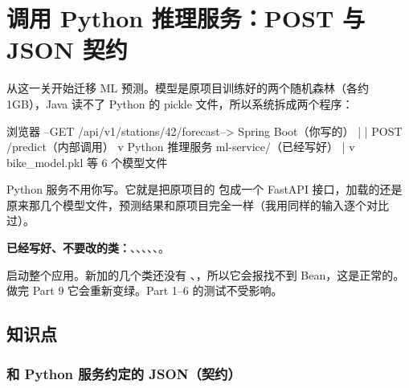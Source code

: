 \chapter{调用 Python 推理服务：POST 与 JSON 契约}

从这一关开始迁移 ML 预测。模型是原项目训练好的两个随机森林（各约 1GB），Java 读不了 Python 的 pickle 文件，所以系统拆成两个程序：

\begin{plaincode}
浏览器 --GET /api/v1/stations/42/forecast--> Spring Boot（你写的）
                                                 |
                                                 | POST /predict（内部调用）
                                                 v
                                     Python 推理服务 ml-service/（已经写好）
                                                 |
                                                 v
                                     bike_model.pkl 等 6 个模型文件
\end{plaincode}

Python 服务不用你写。它就是把原项目的  包成一个 FastAPI 接口，加载的还是原来那几个模型文件，预测结果和原项目完全一样（我用同样的输入逐个对比过）。


\textbf{已经写好、不要改的类：}、、、、、。

\begin{note}
 启动整个应用。新加的几个类还没有 、，所以它会报找不到 Bean，这是正常的。做完 Part 9 它会重新变绿。Part 1--6 的测试不受影响。
\end{note}

\section{知识点}

\subsection{和 Python 服务约定的 JSON（契约）}

